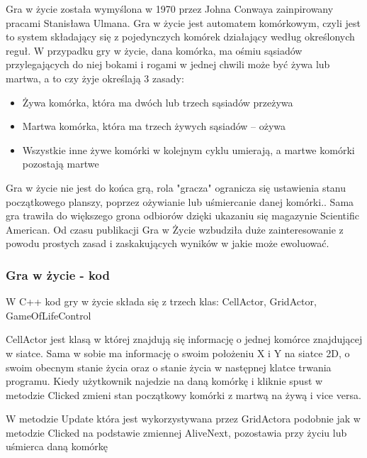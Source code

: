 \documentclass[a4paper,12pt,reqno]{article}
\begin{document}
{\color{blue}
Gra w życie została wymyślona w 1970 przez Johna Conwaya zainpirowany pracami Stanisława Ulmana. Gra w życie jest automatem komórkowym, czyli jest to system składający się z pojedynczych komórek działający według określonych reguł.\cite{game_of_life} W przypadku gry w życie, dana komórka, ma ośmiu sąsiadów przylegających do niej bokami i rogami w jednej chwili może być żywa lub martwa, a to czy żyje określają 3 zasady:

\begin{itemize}
\item Żywa komórka, która ma dwóch lub trzech sąsiadów przeżywa
\item Martwa komórka, która ma trzech żywych sąsiadów – ożywa
\item Wszystkie inne żywe komórki w kolejnym cyklu umierają, a martwe komórki pozostają martwe
\end{itemize}

Gra w życie nie jest do końca grą, rola "gracza" ogranicza się ustawienia stanu początkowego planszy, poprzez ożywianie lub uśmiercanie danej komórki.\cite{game_of_life_wiki}. Sama gra trawiła do większego grona odbiorów dzięki ukazaniu się magazynie Scientific American. Od czasu publikacji Gra w Życie wzbudziła duże zainteresowanie z powodu prostych zasad i zaskakujących wyników w jakie może ewoluować.

}
\subsubsection{Gra w życie - kod}

W C++ kod gry w życie składa się z trzech klas: CellActor, GridActor, GameOfLifeControl

CellActor jest klasą w której znajdują się informację o jednej komórce znajdującej w siatce. Sama w sobie ma informację o swoim położeniu X i Y na siatce 2D, o swoim obecnym stanie życia oraz o stanie życia w następnej klatce trwania programu. 
Kiedy użytkownik najedzie na daną komórkę i kliknie spust w metodzie Clicked zmieni stan początkowy komórki z martwą na żywą i vice versa.



W metodzie Update która jest wykorzystywana przez GridActora podobnie jak w metodzie Clicked na podstawie zmiennej AliveNext, pozostawia przy życiu lub uśmierca daną komórkę
\end{document}

